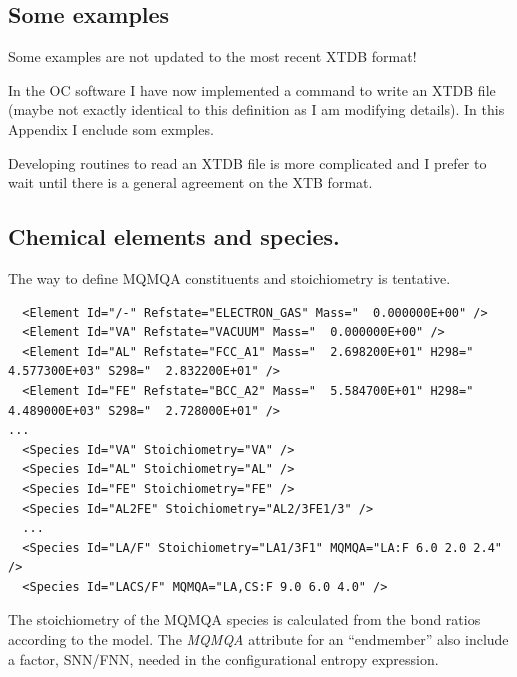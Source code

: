\documentclass{article}
\begin{document}
\newpage
\begin{appendices}
\setcounter{equation}{0}
\renewcommand{\theequation}{A\arabic{equation}}
\setcounter{figure}{0}
\renewcommand{\thefigure}{A\arabic{figure}}


\section{Some examples}\label{sec:examples}

Some examples are not updated to the most recent XTDB format!

In the OC software I have now implemented a command to write an XTDB
file (maybe not exactly identical to this definition as I am modifying
details).  In this Appendix I enclude som exmples.

Developing routines to read an XTDB file is more complicated and I
prefer to wait until there is a general agreement on the XTB format.

\subsection{Chemical elements and species.}\label{sec:elementexample}

The way to define MQMQA constituents and stoichiometry is tentative.

{\small
\begin{verbatim}
  <Element Id="/-" Refstate="ELECTRON_GAS" Mass="  0.000000E+00" />
  <Element Id="VA" Refstate="VACUUM" Mass="  0.000000E+00" />
  <Element Id="AL" Refstate="FCC_A1" Mass="  2.698200E+01" H298="  4.577300E+03" S298="  2.832200E+01" />
  <Element Id="FE" Refstate="BCC_A2" Mass="  5.584700E+01" H298="  4.489000E+03" S298="  2.728000E+01" />
...
  <Species Id="VA" Stoichiometry="VA" />
  <Species Id="AL" Stoichiometry="AL" />
  <Species Id="FE" Stoichiometry="FE" />
  <Species Id="AL2FE" Stoichiometry="AL2/3FE1/3" />
  ...
  <Species Id="LA/F" Stoichiometry="LA1/3F1" MQMQA="LA:F 6.0 2.0 2.4" />
  <Species Id="LACS/F" MQMQA="LA,CS:F 9.0 6.0 4.0" />
\end{verbatim}
}

The stoichiometry of the MQMQA species is calculated from the bond
ratios according to the model.  The {\em MQMQA} attribute for an
``endmember'' also include a factor, SNN/FNN, needed in the
configurational entropy expression.


\end{appendices}
\end{document}
